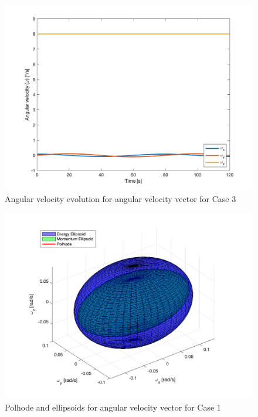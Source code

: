 \begin{figure}[H]
\centering
\includegraphics[scale=0.6]{Images/ps2_problem9_euler_equations_z.png}
\caption{Angular velocity evolution for angular velocity vector for Case 3}
\label{fig:ps2_problem9_euler_equations_z}
\end{figure}

\begin{figure}[H]
\centering
\includegraphics[scale=0.6]{Images/ps2_problem9_p7_x.png}
\caption{Polhode and ellipsoids for angular velocity vector for Case 1}
\label{fig:ps2_problem9_p7_x}
\end{figure}

